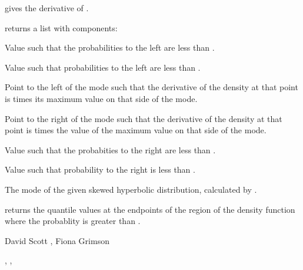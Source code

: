 \begin{Value}
 gives the derivative of .

 returns a list with components:
\begin{ldescription}
\item[\code{xTiny}] Value such that the probabilities to the left are less
than .
\item[\code{xSmall}] Value such that probabilities to the left are less
than .
\item[\code{lowBreak}] Point to the left of the mode such that the
derivative of the density at that point is  times its
maximum value on that side of the mode.
\item[\code{highBreak}] Point to the right of the mode such that the derivative
of the density at that point is  times the value of the
maximum value on that side of the mode.
\item[\code{xLarge}] Value such that the probabities to the right are less than
.
\item[\code{xHuge}] Value such that probability to the right is less than
.
\item[\code{modeDist}] The mode of the given skewed hyperbolic distribution,
calculated by .
\end{ldescription}


 returns the quantile values at the
endpoints of the region of the density function where the probablity
is greater than .
\end{Value}
\begin{Author}\relax
David Scott , Fiona Grimson
\end{Author}
\begin{SeeAlso}\relax
{}, , 
\end{SeeAlso}

